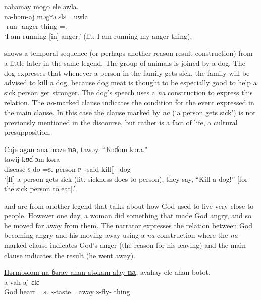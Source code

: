       \medskip
nəhəmay  mogo  ele  əwla.\\      
\gll nə-həm-aj  mɔgʷɔ  ɛlɛ    =uwla\\ 
     {\oneS}-run{}-{\CL}      anger  thing  ={\oneS}.{\POSS}\\
\glt  ‘I am running [in] anger.’ (lit. I am running my anger thing). 
\z

\largerpage
{} shows a temporal sequence (or perhaps another reason-result construction) from a little later in the same legend. The group of animals is joined by a dog. The dog expresses that whenever a person in the family gets sick, the family will be advised to kill a dog, because dog meat is thought to be especially good to help a sick person get stronger. The dog’s speech uses a \textit{na} construction to express this relation. The \textit{na}-marked clause indicates the condition for the event expressed in the main clause. In this case the clause marked by \textit{na}{} (‘a person gets sick’) is not previously mentioned in the discourse, but rather is a fact of life, a cultural presupposition. 

\ea \label{ex:11:16}
\underline{Cəje  agan  ana  məze  \textbf{na}},  tawəy,  “Kəɗom  kəra."\\
\gll  {}                 tawij   kʊɗ-ɔm     kəra\\
      disease  \textsc{s}-do  =\textsc{s}.{\IO}  {\DAT} person  {\PSP}  \textsc{p}+said  kill[{\IMP}]-{\twoP}  dog\\
\glt  ‘[If] a person gets sick (lit. sickness does to person), they say, “Kill a dog!” [for the sick person to eat].’ 
\z

 and  are from another legend that talks about how God used to live very close to people. However one day, a woman did something that made God angry, and so he moved far away from them. The narrator expresses the relation between God becoming angry and his moving away using a \textit{na} construction  where the \textit{na}-marked clause indicates God’s anger (the reason for his leaving) and the main clause indicates the result (he went away). 

\ea \label{ex:11:17}
\underline{Hərmbəlom  na  ɓərav  ahan  atəkam  alay  \textbf{na}},  avahay  ele  ahan  botot.\\
\gll  {}           a-vah-aj ɛlɛ\\ 
      God  {\PSP}  heart =\textsc{s}.{\POSS} \textsc{s}-taste  =away {\PSP} \textsc{s}-fly{}-{\CL}  thing\\  
      
